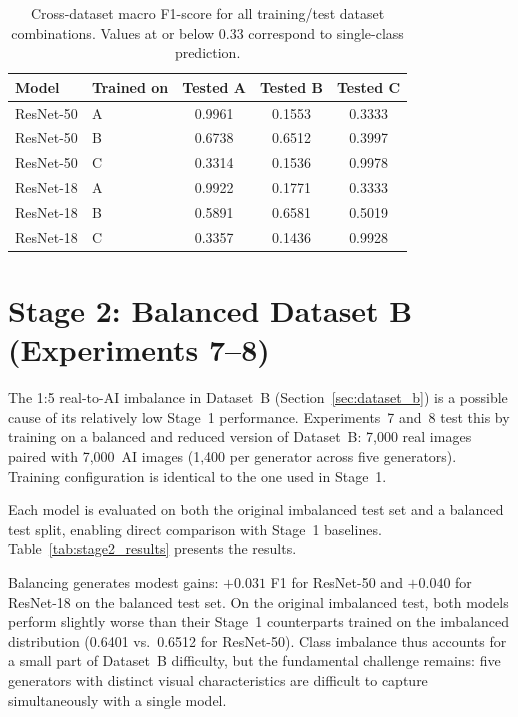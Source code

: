 \begin{table}[h!]
  \centering
  \caption{Cross-dataset macro F1-score for all training/test dataset combinations.
           Values at or below 0.33 correspond to single-class prediction.}
  \label{tab:cross_dataset_matrix}
  \begin{tabular}{llccc}
    \hline
    \textbf{Model} & \textbf{Trained on} & \textbf{Tested A} & \textbf{Tested B} & \textbf{Tested C} \\
    \hline
    ResNet-50 & A & 0.9961 & 0.1553 & 0.3333 \\
    ResNet-50 & B & 0.6738 & 0.6512 & 0.3997 \\
    ResNet-50 & C & 0.3314 & 0.1536 & 0.9978 \\
    \hline
    ResNet-18 & A & 0.9922 & 0.1771 & 0.3333 \\
    ResNet-18 & B & 0.5891 & 0.6581 & 0.5019 \\
    ResNet-18 & C & 0.3357 & 0.1436 & 0.9928 \\
    \hline
  \end{tabular}
\end{table}


\section{Stage 2: Balanced Dataset B (Experiments 7--8)}
\label{sec:stage2}

The 1:5 real-to-AI imbalance in Dataset~B (Section~\ref{sec:dataset_b}) is a possible
cause of its relatively low Stage~1 performance. Experiments~7 and~8 test this by training
on a balanced and reduced version of Dataset~B: 7,000 real images paired with 7,000~AI images (1,400
per generator across five generators). Training configuration is identical to the one used in
Stage~1.

Each model is evaluated on both the original imbalanced test set and a balanced test split,
enabling direct comparison with Stage~1 baselines. Table~\ref{tab:stage2_results} presents
the results.

Balancing generates modest gains: $+0.031$ F1 for ResNet-50 and $+0.040$ for ResNet-18 on
the balanced test set. On the original imbalanced test, both models perform slightly worse
than their Stage~1 counterparts trained on the imbalanced distribution (0.6401
vs.\ 0.6512 for ResNet-50). Class imbalance thus accounts for a small part of Dataset~B
difficulty, but the fundamental challenge remains: five generators with distinct visual
characteristics are difficult to capture simultaneously with a single model.

